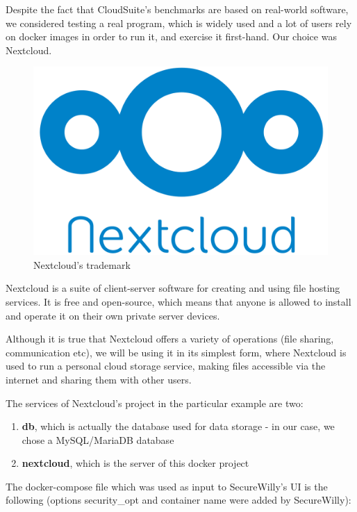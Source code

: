 Despite the fact that CloudSuite's benchmarks are based on real-world software, we considered testing a real program, which is widely used and a lot of users rely on docker images in order to run it, and exercise it first-hand. Our choice was Nextcloud.

\begin{figure}[h!]
  \centering
   \includegraphics[width=0.3\linewidth]{figures/Nextcloud.png}
   \caption{Nextcloud's trademark}
\end{figure}

Nextcloud is a suite of client-server software for creating and using file hosting services. It is free and open-source, which means that anyone is allowed to install and operate it on their own private server devices. \cite{wikinext}

Although it is true that Nextcloud offers a variety of operations (file sharing, communication etc), we will be using it in its simplest form, where Nextcloud is used to run a personal cloud storage service, making files accessible via the internet and sharing them with other users.

The services of Nextcloud's project in the particular example are two:
\begin{enumerate}
\item \textbf{db}, which is actually the database used for data storage - in our case, we chose a MySQL/MariaDB database
\item \textbf{nextcloud}, which is the server of this docker project
\end{enumerate}

The docker-compose file which was used as input to SecureWilly's UI is the following (options security\_opt and container name were added by SecureWilly):

